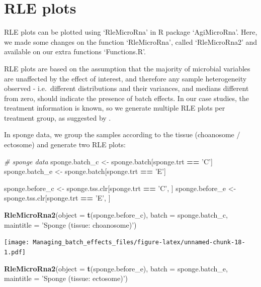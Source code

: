 \documentclass[]{book}
\newenvironment{Shaded}{\begin{snugshade}}{\end{snugshade}}
\newcommand{\KeywordTok}[1]{\textcolor[rgb]{0.13,0.29,0.53}{\textbf{#1}}}
\newcommand{\DataTypeTok}[1]{\textcolor[rgb]{0.13,0.29,0.53}{#1}}
\newcommand{\StringTok}[1]{\textcolor[rgb]{0.31,0.60,0.02}{#1}}
\newcommand{\CommentTok}[1]{\textcolor[rgb]{0.56,0.35,0.01}{\textit{#1}}}
\newcommand{\OperatorTok}[1]{\textcolor[rgb]{0.81,0.36,0.00}{\textbf{#1}}}
\newcommand{\NormalTok}[1]{#1}
\begin{document}
\section{RLE plots}\label{rle-plots}

RLE plots can be plotted using `RleMicroRna' in R package `AgiMicroRna'.
Here, we made some changes on the function `RleMicroRna', called
`RleMicroRna2' and available on our extra functions `Functions.R'.

RLE plots are based on the assumption that the majority of microbial
variables are unaffected by the effect of interest, and therefore any
sample heterogeneity observed - i.e.~different distributions and their
variances, and medians different from zero, should indicate the presence
of batch effects. In our case studies, the treatment information is
known, so we generate multiple RLE plots per treatment group, as
suggested by \citep{lin2018scmerge}.

In sponge data, we group the samples according to the tissue (choanosome
/ ectosome) and generate two RLE plots:

\begin{Shaded}
\begin{Highlighting}[]
\CommentTok{# sponge data}
\NormalTok{sponge.batch_c <-}\StringTok{ }\NormalTok{sponge.batch[sponge.trt }\OperatorTok{==}\StringTok{ 'C'}\NormalTok{]}
\NormalTok{sponge.batch_e <-}\StringTok{ }\NormalTok{sponge.batch[sponge.trt }\OperatorTok{==}\StringTok{ 'E'}\NormalTok{] }

\NormalTok{sponge.before_c <-}\StringTok{ }\NormalTok{sponge.tss.clr[sponge.trt }\OperatorTok{==}\StringTok{ 'C'}\NormalTok{, ]}
\NormalTok{sponge.before_e <-}\StringTok{ }\NormalTok{sponge.tss.clr[sponge.trt }\OperatorTok{==}\StringTok{ 'E'}\NormalTok{, ] }


\KeywordTok{RleMicroRna2}\NormalTok{(}\DataTypeTok{object =} \KeywordTok{t}\NormalTok{(sponge.before_c), }\DataTypeTok{batch =}\NormalTok{ sponge.batch_c, }
             \DataTypeTok{maintitle =} \StringTok{'Sponge (tissue: choanosome)'}\NormalTok{)}
\end{Highlighting}
\end{Shaded}

\texttt{[image: Managing\_batch\_effects\_files/figure-latex/unnamed-chunk-18-1.pdf]}

\begin{Shaded}
\begin{Highlighting}[]
\KeywordTok{RleMicroRna2}\NormalTok{(}\DataTypeTok{object =} \KeywordTok{t}\NormalTok{(sponge.before_e), }\DataTypeTok{batch =}\NormalTok{ sponge.batch_e, }
             \DataTypeTok{maintitle =} \StringTok{'Sponge (tissue: ectosome)'}\NormalTok{)}
\end{Highlighting}
\end{Shaded}
\end{document}

